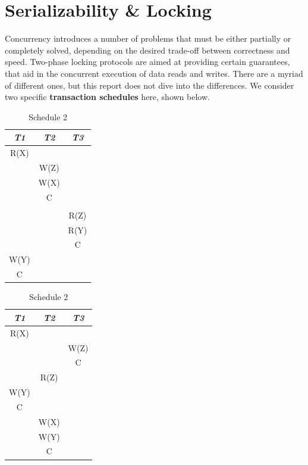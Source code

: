 \section{Serializability \& Locking}
Concurrency introduces a number of problems that
must be either partially or completely solved, depending on the desired
trade-off between correctness and speed. Two-phase locking protocols are
aimed at providing certain guarantees, that aid in the concurrent execution of
data reads and writes. There are a myriad of different ones, but this report
does not dive into the differences. We consider two specific \textbf{transaction schedules} 
here, shown below.

\begin{table}[!htb]
    \begin{minipage}{.5\linewidth}
        \caption*{Schedule 1}
        \begin{tabular}{c|c|c}
            \textit{T1} & \textit{T2} & \textit{T3} \\ \hline
            R(X) & & \\
            & W(Z) & \\
            & W(X) & \\
            & C & \\
            & & \\
            & & R(Z) \\
            & & R(Y) \\
            & & C \\
            W(Y) & & \\
            C & & \\
        \end{tabular}
    \end{minipage}
    \begin{minipage}{.5\linewidth}
        \caption*{Schedule 2}
        \begin{tabular}{c|c|c}
            \textit{T1} & \textit{T2} & \textit{T3} \\ \hline
            R(X) & & \\
            & & W(Z) \\
            & & C \\
            & R(Z) & \\
            W(Y) & & \\
            C & & \\
            & W(X) & \\
            & W(Y) & \\
            & C &
        \end{tabular}
    \end{minipage}
\end{table}
